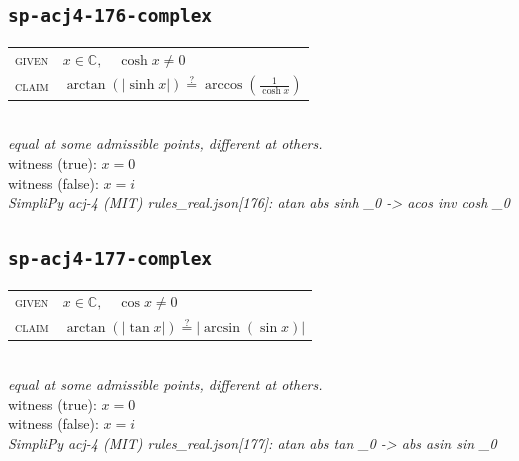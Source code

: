 \documentclass[11pt]{article}
\begin{document}
\subsection*{\texttt{sp-acj4-176-complex}}
\begin{tabular}{@{}l@{\quad}l@{}}
\textsc{given} & $x \in \mathbb{C},\quad \cosh x \neq 0$ \\[4pt]
\textsc{claim} & $\displaystyle \arctan\left(\left|\sinh x\right|\right) \overset{?}{=} \arccos\left(\frac{1}{\cosh x}\right)$ \\
\end{tabular}\\[2pt]
{\small\emph{equal at some admissible points, different at others.}}\\
{\footnotesize\color{gray}witness (true): $x = 0$}\\
{\footnotesize\color{gray}witness (false): $x = i$}\\
\emph{SimpliPy acj-4 (MIT) rules\_real.json[176]: atan abs sinh \_0  ->  acos inv cosh \_0}\\

\subsection*{\texttt{sp-acj4-177-complex}}
\begin{tabular}{@{}l@{\quad}l@{}}
\textsc{given} & $x \in \mathbb{C},\quad \cos x \neq 0$ \\[4pt]
\textsc{claim} & $\displaystyle \arctan\left(\left|\tan x\right|\right) \overset{?}{=} \left|\arcsin\left(\sin x\right)\right|$ \\
\end{tabular}\\[2pt]
{\small\emph{equal at some admissible points, different at others.}}\\
{\footnotesize\color{gray}witness (true): $x = 0$}\\
{\footnotesize\color{gray}witness (false): $x = i$}\\
\emph{SimpliPy acj-4 (MIT) rules\_real.json[177]: atan abs tan \_0  ->  abs asin sin \_0}\\
\end{document}

